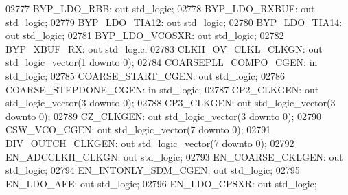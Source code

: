 \begin{DoxyCode}
02777     BYP\_LDO\_RBB:    \textcolor{keywordflow}{out} \textcolor{comment}{std\_logic};
02778     BYP\_LDO\_RXBUF:  \textcolor{keywordflow}{out} \textcolor{comment}{std\_logic};
02779     BYP\_LDO\_TIA12:  \textcolor{keywordflow}{out} \textcolor{comment}{std\_logic};
02780     BYP\_LDO\_TIA14:  \textcolor{keywordflow}{out} \textcolor{comment}{std\_logic};
02781     BYP\_LDO\_VCOSXR: \textcolor{keywordflow}{out} \textcolor{comment}{std\_logic};
02782     BYP\_XBUF\_RX:    \textcolor{keywordflow}{out} \textcolor{comment}{std\_logic};
02783     CLKH\_OV\_CLKL\_CLKGN: \textcolor{keywordflow}{out} \textcolor{comment}{std\_logic\_vector}(\textcolor{vhdllogic}{}\textcolor{vhdllogic}{1} \textcolor{keywordflow}{downto} \textcolor{vhdllogic}{}\textcolor{vhdllogic}{0});
02784     COARSEPLL\_COMPO\_CGEN:   \textcolor{keywordflow}{in} \textcolor{comment}{std\_logic};
02785     COARSE\_START\_CGEN:  \textcolor{keywordflow}{out} \textcolor{comment}{std\_logic};
02786     COARSE\_STEPDONE\_CGEN:   \textcolor{keywordflow}{in} \textcolor{comment}{std\_logic};
02787     CP2\_CLKGEN: \textcolor{keywordflow}{out} \textcolor{comment}{std\_logic\_vector}(\textcolor{vhdllogic}{}\textcolor{vhdllogic}{3} \textcolor{keywordflow}{downto} \textcolor{vhdllogic}{}\textcolor{vhdllogic}{0});
02788     CP3\_CLKGEN: \textcolor{keywordflow}{out} \textcolor{comment}{std\_logic\_vector}(\textcolor{vhdllogic}{}\textcolor{vhdllogic}{3} \textcolor{keywordflow}{downto} \textcolor{vhdllogic}{}\textcolor{vhdllogic}{0});
02789     CZ\_CLKGEN:  \textcolor{keywordflow}{out} \textcolor{comment}{std\_logic\_vector}(\textcolor{vhdllogic}{}\textcolor{vhdllogic}{3} \textcolor{keywordflow}{downto} \textcolor{vhdllogic}{}\textcolor{vhdllogic}{0});
02790     CSW\_VCO\_CGEN:   \textcolor{keywordflow}{out} \textcolor{comment}{std\_logic\_vector}(\textcolor{vhdllogic}{}\textcolor{vhdllogic}{7} \textcolor{keywordflow}{downto} \textcolor{vhdllogic}{}\textcolor{vhdllogic}{0});
02791     DIV\_OUTCH\_CLKGEN:   \textcolor{keywordflow}{out} \textcolor{comment}{std\_logic\_vector}(\textcolor{vhdllogic}{}\textcolor{vhdllogic}{7} \textcolor{keywordflow}{downto} \textcolor{vhdllogic}{}\textcolor{vhdllogic}{0});
02792     EN\_ADCCLKH\_CLKGN:   \textcolor{keywordflow}{out} \textcolor{comment}{std\_logic};
02793     EN\_COARSE\_CKLGEN:   \textcolor{keywordflow}{out} \textcolor{comment}{std\_logic};
02794     EN\_INTONLY\_SDM\_CGEN:    \textcolor{keywordflow}{out} \textcolor{comment}{std\_logic};
02795     EN\_LDO\_AFE: \textcolor{keywordflow}{out} \textcolor{comment}{std\_logic};
02796     EN\_LDO\_CPSXR:   \textcolor{keywordflow}{out} \textcolor{comment}{std\_logic};

\end{DoxyCode}
